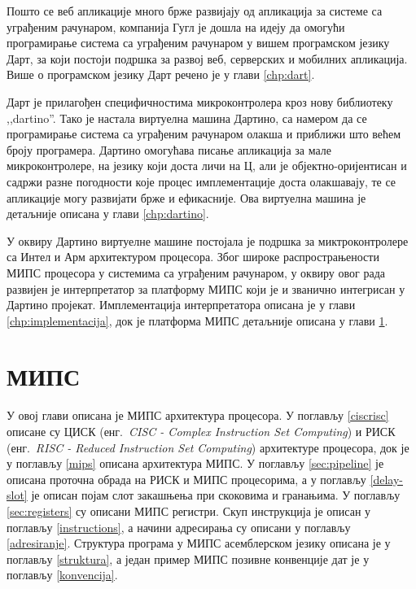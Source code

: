\documentclass[12pt,oneside]{memoir}
\begin{document}
Пошто се веб апликације много брже развијају од апликација за системе са уграђеним рачунаром, компанија Гугл је дошла на идеју да омогући програмирање система са уграђеним рачунаром у вишем програмском језику Дарт, за који постоји подршка за развој веб, серверских и мобилних апликација. Више о програмском језику Дарт речено је у глави \ref{chp:dart}.

Дарт је прилагођен специфичностима микроконтролера кроз нову библиотеку ,,dartino''. Тако је настала виртуелна машина Дартино, са намером да се програмирање система са уграђеним рачунаром олакша и приближи што већем броју програмера. Дартино омогућава писање апликација за мале микроконтролере, на језику који доста личи на Ц, али је објектно-оријентисан и садржи разне погодности које процес имплементације доста олакшавају, те се апликације могу развијати брже и ефикасније. Ова виртуелна машина је детаљније описана у глави \ref{chp:dartino}.

У оквиру Дартино виртуелне машине постојала је подршка за миктроконтролере са Интел и Арм архитектуром процесора. Због широке распрострањености МИПС процесора у системима са уграђеним рачунаром, у оквиру овог рада развијен је интерпретатор за платформу МИПС који је и званично интегрисан у Дартино пројекат. Имплементација интерпретатора описана је у глави \ref{chp:implementacija}, док је платформа МИПС детаљније описана у глави \ref{chp:mips}.\\




\chapter{МИПС}
\label{chp:mips}
У овој глави описана је МИПС архитектура процесора. У поглављу \ref{ciscrisc} описане су ЦИСК (енг.~\textit{CISC - Complex Instruction Set Computing}) и РИСК (енг.~\textit{RISC - Reduced Instruction Set Computing}) архитектуре процесора, док је у поглављу \ref{mips} описана архитектура МИПС. У поглављу \ref{sec:pipeline} је описана проточна обрада на РИСК и МИПС процесорима, а у поглављу \ref{delay-slot} је описан појам слот закашњења при скоковима и гранањима.  У поглављу \ref{sec:registers} су описани МИПС регистри. Скуп инструкција је описан у поглављу \ref{instructions}, а начини адресирања су описани у поглављу \ref{adresiranje}. Структура програма у МИПС асемблерском језику описана је у поглављу \ref{struktura}, а један пример МИПС позивне конвенције дат је у поглављу \ref{konvencija}.
\end{document}
